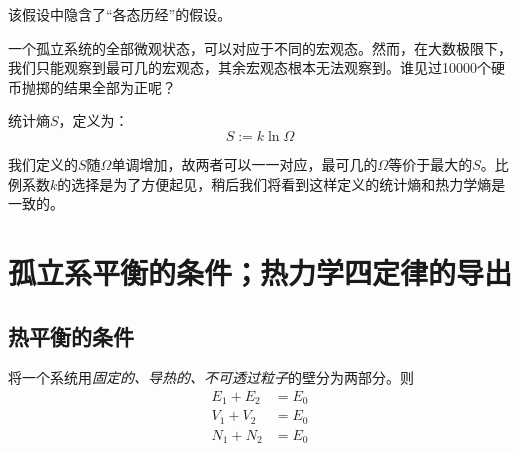 \begin{rek}
    该假设中隐含了“各态历经”的假设。
\end{rek}

\begin{rek}
    一个孤立系统的全部微观状态，可以对应于不同的宏观态。然而，在大数极限下，我们只能观察到最可几的宏观态，其余宏观态根本无法观察到。谁见过10000个硬币抛掷的结果全部为正呢？
\end{rek}

\begin{defn}
    统计熵$S$，定义为：
    \begin{equation}
        S := k \ln \Omega
    \end{equation}
\end{defn}
\begin{rek}
    我们定义的$S$随$\Omega$单调增加，故两者可以一一对应，最可几的$\Omega$等价于最大的$S$。比例系数$k$的选择是为了方便起见，稍后我们将看到这样定义的统计熵和热力学熵是一致的。
\end{rek}

\chapter{孤立系平衡的条件；热力学四定律的导出}
\section{热平衡的条件}
将一个系统用\emph{固定的、导热的、不可透过粒子}的壁分为两部分。则
\begin{align*}
    E_1 + E_2 & = E_0 \\
    V_1 + V_2 & = E_0 \\
    N_1 + N_2 & = E_0
\end{align*}

